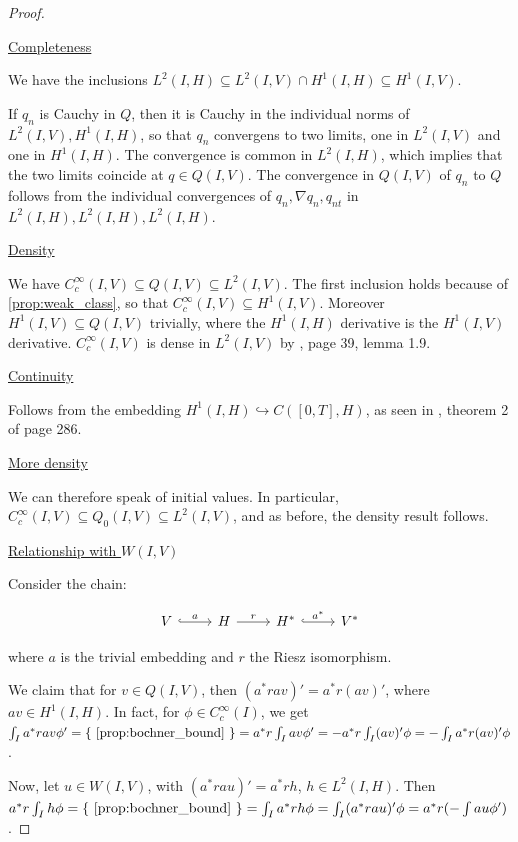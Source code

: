 \documentclass[english,a4paper,10pt,oneside]{scrbook}	%
\theoremstyle{break}
\newenvironment{mproof}[1][\proofname]{%
  \begin{proof}[#1]$ $\par\nobreak\ignorespaces
}{%
  \end{proof}
}
\renewcommand*{\proofname}{Proof}
\theoremstyle{remark}
\newcommand{\emb}{\hookrightarrow}
\newcommand{\ind}[1]{\{\text{ #1 }\}}
\begin{document}
\begin{mproof}

\underline{Completeness}

We have the inclusions $L^2(I,H)\subseteq L^2(I,V)\cap H^1(I,H)\subseteq H^1(I,V)$.

If $q_n$ is Cauchy in $Q$, then it is Cauchy in the individual norms of $ L^2(I,V), H^1(I,H)$, so that $q_n$ convergens to two limits, one in $L^2(I,V)$ and one in $H^1(I,H)$. The convergence is common in $L^2(I,H)$, which implies that the two limits coincide at $q \in Q(I,V)$. The convergence in $Q(I,V)$ of $q_n$ to $Q$ follows from the individual convergences of $q_n, \nabla q_n, q_{nt}$ in $ L^2(I,H), L^2(I,H),L^2(I,H)$.

\underline{Density}

We have $C_c^\infty(I,V) \subseteq Q(I,V) \subseteq L^2(I,V)$. The first inclusion holds because of \cref{prop:weak_class}, so that $C_c^\infty(I,V)\subseteq H^1(I,V)$. Moreover $H^1(I,V)\subseteq  Q(I,V) $ trivially, where the $H^1(I,H)$ derivative is the $H^1(I,V)$ derivative. $C_c^\infty(I,V)$ is dense in $ L^2(I,V)$ by \cite{hinze}, page 39, lemma 1.9.

\underline{Continuity}

Follows from the embedding $H^1(I,H)\emb C([0,T],H)$, as seen in \cite{evans}, theorem 2 of page 286.

\underline{More density}

We can therefore speak of initial values. In particular,  $C_c^\infty(I,V) \subseteq Q_0(I,V)\subseteq L^2(I,V)$, and as before, the density result follows.

\underline{Relationship with $W(I,V)$}

Consider the chain:

\[\begin{tikzcd}
	V & H & {H^*} & {V^*}
	\arrow["a", hook, from=1-1, to=1-2]
	\arrow["r", from=1-2, to=1-3]
	\arrow["{a^*}", hook, from=1-3, to=1-4]
\end{tikzcd}\]

where $a$ is the trivial embedding and $r$ the Riesz isomorphism.

We claim that for $v \in Q(I,V)$, then $(a^*ra v)' = a^*r (av)'$, where $av \in H^1(I,H)$. In fact, for $\phi \in C^\infty_c(I)$, we get $\int_I a^*ra v \phi' = \ind{\ref{prop:bochner_bound}} = a^*r\int_I av\phi' = -a^*r\int_I(av)'\phi =-\int_I a^*r(av)' \phi$.

Now, let $u \in W(I,V)$, with $(a^*ra u)' = a^*r h$, $h \in L^2(I,H)$. Then $ a^*r \int_I h \phi = \ind{\ref{prop:bochner_bound}} = \int_I a^*r h \phi  = \int_I (a^*ra u)' \phi =  a^*r (-\int au \phi')$.


\end{mproof}
\end{document}
